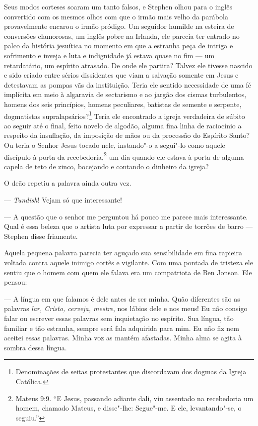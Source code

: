 Seus modos corteses soaram um tanto falsos, e Stephen olhou para o
inglês convertido com os mesmos olhos com que o irmão mais velho da
parábola provavelmente encarou o irmão pródigo. Um seguidor humilde na
esteira de conversões clamorosas, um inglês pobre na Irlanda, ele
parecia ter entrado no palco da história jesuítica no momento em que a
estranha peça de intriga e sofrimento e inveja e luta e indignidade já
estava quase no fim --- um retardatário, um espírito atrasado. De onde
ele partira? Talvez ele tivesse nascido e sido criado entre sérios
dissidentes que viam a salvação somente em Jesus e detestavam as pompas
vãs da instituição. Teria ele sentido necessidade de uma fé implícita
em meio à algaravia de sectarismo e ao jargão dos cismas turbulentos,
homens dos seis princípios, homens peculiares, batistas de semente e
serpente, dogmatistas supralapsários?\footnote{ Denominações
de seitas protestantes que discordavam dos dogmas da Igreja Católica.}
Teria ele encontrado a igreja verdadeira de súbito ao seguir até o
final, feito novelo de algodão, alguma fina linha de raciocínio a
respeito da insuflação, da imposição de mãos ou da processão do
Espírito Santo? Ou teria o Senhor Jesus tocado nele, instando"-o a
segui"-lo como aquele discípulo à porta da recebedoria,\footnote{ Mateus
9:9. “E Jesus, passando adiante dali, viu assentado na recebedoria um homem, 
chamado Mateus, e disse"-lhe: Segue"-me. E ele, levantando"-se, o seguiu.”} um
dia quando ele estava à porta de alguma capela de teto de zinco,
bocejando e contando o dinheiro da igreja?

O deão repetiu a palavra ainda outra vez.

 --- \textit{Tundish}! Vejam só que interessante!

 --- A questão que o senhor me perguntou há pouco me parece mais interessante.
Qual é essa beleza que o artista luta por expressar a partir de torrões
de barro --- Stephen disse friamente.

Aquela pequena palavra parecia ter aguçado sua sensibilidade em fina
rapieira voltada contra aquele inimigo cortês e vigilante. Com uma
pontada de tristeza ele sentiu que o homem com quem ele falava era um
compatriota de Ben Jonson. Ele pensou:

 --- A língua em que falamos é dele antes de ser minha. Quão diferentes são
as palavras \textit{lar, Cristo, cerveja, mestre}, nos lábios dele e
nos meus! Eu não consigo falar ou escrever essas palavras sem
inquietação no espírito. Sua língua, tão familiar e tão estranha,
sempre será fala adquirida para mim. Eu não fiz nem aceitei essas
palavras. Minha voz as mantém afastadas. Minha alma se agita à sombra
dessa língua.

